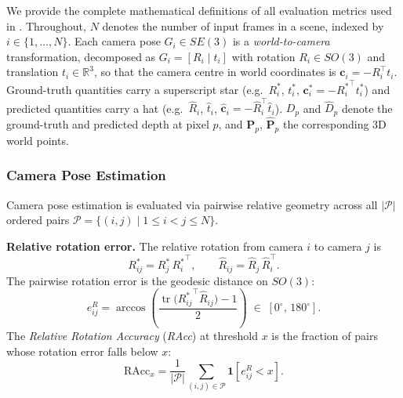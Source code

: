 We provide the complete mathematical definitions of all evaluation metrics used in \benchmark.
%
Throughout, $N$ denotes the number of input frames in a scene, indexed by $i\in\{1,\ldots,N\}$.
%
Each camera pose $G_i\in SE(3)$ is a \emph{world-to-camera} transformation, decomposed as $G_i=[R_i\mid t_i]$ with rotation $R_i\in SO(3)$ and translation $t_i\in\mathbb{R}^3$, so that the camera centre in world coordinates is $\mathbf{c}_i=-R_i^{\top}t_i$.
%
Ground-truth quantities carry a superscript star (e.g.\ $R_i^*$, $t_i^*$, $\mathbf{c}_i^*=-{R_i^*}^{\!\top}t_i^*$) and predicted quantities carry a hat (e.g.\ $\hat{R}_i$, $\hat{t}_i$, $\hat{\mathbf{c}}_i=-\hat{R}_i^{\top}\hat{t}_i$).
%
$D_p$ and $\hat{D}_p$ denote the ground-truth and predicted depth at pixel $p$, and $\mathbf{P}_p$, $\hat{\mathbf{P}}_p$ the corresponding 3D world points.

\subsubsection{Camera Pose Estimation}
\label{appendix:metrics:pose}

Camera pose estimation is evaluated via pairwise relative geometry across all $|\mathcal{P}|$ ordered pairs $\mathcal{P}=\{(i,j)\mid 1\!\le\!i\!<\!j\!\le\!N\}$.

\textbf{Relative rotation error.} The relative rotation from camera $i$ to camera $j$ is
\begin{equation}
  R_{ij}^{*} = R_j^{*}\,{R_i^{*}}^{\!\top},
  \qquad
  \hat{R}_{ij} = \hat{R}_j\,\hat{R}_i^{\top}.
\end{equation}
The pairwise rotation error is the geodesic distance on $SO(3)$:
\begin{equation}
  e^{R}_{ij}
  = \arccos\!\left(\frac{\operatorname{tr}\!\bigl({R_{ij}^{*}}^{\!\top}\hat{R}_{ij}\bigr)-1}{2}\right)
  \;\in\; [0^{\circ},\,180^{\circ}].
  \label{eq:rre}
\end{equation}
The \emph{Relative Rotation Accuracy} (\textit{RAcc}) at threshold $x$ is the fraction of pairs whose rotation error falls below $x$:
\begin{equation}
  \mathrm{RAcc}_{x}
  = \frac{1}{|\mathcal{P}|}\sum_{(i,j)\in\mathcal{P}}
    \mathbf{1}\!\left[e^{R}_{ij} < x\right].
  \label{eq:racc}
\end{equation}

